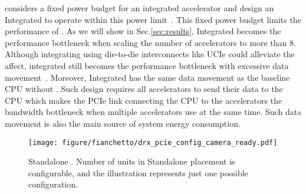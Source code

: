 \dmx considers a fixed power budget 
for an integrated accelerator and design an Integrated \drx to operate within this power limit~\cite{supermicro-sapphire-rapids, ibm-compression-accelerator:isca:2020}.  
%
%
%
This fixed power budget limits the performance of \drx.
%
As we will show in Sec.\ref{sec:results}, Integrated \drx becomes the performance bottleneck when scaling the number of accelerators to more than 8.
%    
Although integrating \drx %
using die-to-die interconnects like UCIe could alleviate the affect, integrated \drx still becomes the performance bottleneck with excessive data movement~\cite{amd-chiplet:isca:2021, odsa-bow-spec, ucie-spec}.
%
Moreover, Integrated \drx has the same data movement as the baseline CPU without \drx. Such design requires all accelerators to send their data to the CPU which makes the PCIe link connecting the CPU to the accelerators the bandwidth bottleneck when multiple accelerators use \drx at the same time. Such data movement is also the main source of system energy consumption. %

\begin{figure}[ht!]
    \centering
    \texttt{[image: figure/fianchetto/drx\_pcie\_config\_camera\_ready.pdf]}
    \caption{Standalone \drx. Number of \drx units in Standalone placement is configurable, and the illustration represents just one possible configuration.}
    \label{fig:standalone-drx}
\end{figure}

